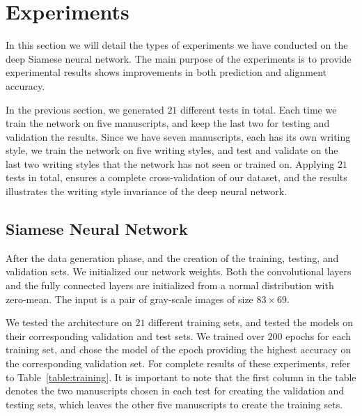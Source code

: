 \documentclass[10pt, a4paper, conference, compsocconf]{IEEEtran}
\begin{document}
\section{Experiments}
In this section we will detail the types of experiments we have conducted on the deep Siamese neural network. The main purpose of the experiments is to provide experimental results shows improvements in both prediction and alignment accuracy.

In the previous section, we generated $21$ different tests in total. Each time we train the network on five manuscripts, and keep the last two for testing and validation the results. Since we have seven manuscripts, each has its own writing style, we train the network on five writing styles, and test and validate on the last two writing styles that the network has not seen or trained on. Applying $21$ tests in total, ensures a complete cross-validation of our dataset, and the results illustrates the writing style invariance of the deep neural network.

\subsection{Siamese Neural Network}
After the data generation phase, and the creation of the training, testing, and validation sets. We initialized our network weights. Both the convolutional layers and the fully connected layers are initialized from a normal distribution with zero-mean. The input is a pair of gray-scale images of size $83 \times 69$. 

We tested the architecture on $21$ different training sets, and tested the models on their corresponding validation and test sets. We trained over $200$ epochs for each training set, and chose the model of the epoch providing the highest accuracy on the corresponding validation set. For complete results of these experiments, refer to Table~\ref{table:training}. It is important to note that the first column in the table denotes the two manuscripts chosen in each test for creating the validation and testing sets, which leaves the other five manuscripts to create the training sets.
\end{document}

